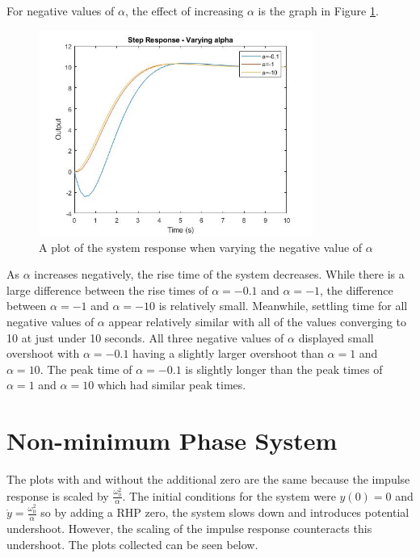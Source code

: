For negative values of $\alpha$, the effect of increasing $\alpha$ is the graph in Figure \ref{fig:varying-alpha-negative}.
\begin{figure}[H]
	\centering
	\includegraphics[width=0.8\textwidth]{./figures/lab4_fig4-part4-3-2-negative.jpg}
	\caption{A plot of the system response when varying the negative value of $\alpha$}
	\label{fig:varying-alpha-negative}
\end{figure}
As $\alpha$ increases negatively, the rise time of the system decreases. While there is a large difference between the rise times of $\alpha = -0.1$ and $\alpha = -1$, the difference between $\alpha = -1$ and $\alpha = -10$ is relatively small. Meanwhile, settling time for all negative values of $\alpha$ appear relatively similar with all of the values converging to 10 at just under 10 seconds. All three negative values of $\alpha$ displayed small overshoot with $\alpha = -0.1$ having a slightly larger overshoot than $\alpha =1$ and $\alpha = 10$. The peak time of $\alpha = -0.1$ is slightly longer than the peak times of $\alpha = 1$ and $\alpha = 10$ which had similar peak times.

\section{Non-minimum Phase System}

The plots with and without the additional zero are the same because the impulse response is scaled by $\frac{\omega^{2}_{0}}{\alpha}$. The initial conditions for the system were $y(0)=0$ and $\dot y=\frac{\omega^{2}_{0}}{\alpha}$ so by adding a RHP zero, the system slows down and introduces potential undershoot. However, the scaling of the impulse response counteracts this undershoot. The plots collected can be seen below.

